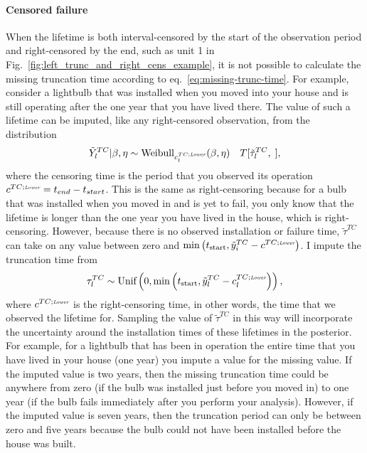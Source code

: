 \paragraph*{Censored failure}
When the lifetime is both interval-censored by the start of the observation period and right-censored by the end, such as unit 1 in Fig.~\ref{fig:left_trunc_and_right_cens_example}, it is not possible to calculate the missing truncation time according to eq.~\eqref{eq:missing-trunc-time}. For example, consider a lightbulb that was installed when you moved into your house and is still operating after the one year that you have lived there. The value of such a lifetime can be imputed, like any right-censored observation, from the distribution
\begin{equation}
    \tilde{Y}^{TC}_l|\beta, \eta \sim \hbox{Weibull}_{c^{TC;\textit{\tiny{Lower}}}_{l}}(\beta, \eta) \quad T[\tilde{\tau}^{TC}_l, \;], 
\end{equation}
where the censoring time is the period that you observed its operation $c^{TC;\textit{\tiny{Lower}}} = t_{end} - t_{start}$. This is the same as right-censoring because for a bulb that was installed when you moved in and is yet to fail, you only know that the lifetime is longer than the one year you have lived in the house, which is right-censoring. However, because there is no observed installation or failure time, $\tilde{\tau}^{TC}$ can take on any value between zero and $\min\left(t_\text{start}, \tilde{y}^{TC}_i - c^{TC;\textit{\tiny{Lower}}}\right)$. I impute the truncation time from
\begin{equation}
    \label{eq:imp-trun-times}
    \tau^{TC}_l \sim \hbox{Unif}\left(0, \min\left(t_\text{start}, \tilde{y}^{TC}_l - c^{TC;\textit{\tiny{Lower}}}_l\right)\right),
\end{equation}
where $c^{TC;\textit{\tiny{Lower}}}$ is the right-censoring time, in other words, the time that we observed the lifetime for. Sampling the value of $\tilde{\tau}^{TC}$ in this way will incorporate the uncertainty around the installation times of these lifetimes in the posterior. For example, for a lightbulb that has been in operation the entire time that you have lived in your house (one year) you impute a value for the missing value. If the imputed value is two years, then the missing truncation time could be anywhere from zero (if the bulb was installed just before you moved in) to one year (if the bulb fails immediately after you perform your analysis). However, if the imputed value is seven years, then the truncation period can only be between zero and five years because the bulb could not have been installed before the house was built.


